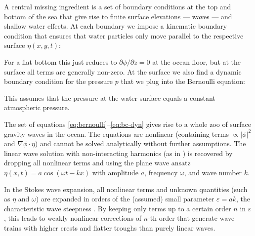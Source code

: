 A central missing ingredient is a set of boundary conditions at the top and bottom of the sea that give rise to finite surface elevations --- waves --- and shallow water effects. At each boundary we impose a kinematic boundary condition that ensures that water particles only move parallel to the respective surface $\eta(x, y, t)$:


For a flat bottom this just reduces to $\partial \phi / \partial z = 0$ at the ocean floor, but at the surface all terms are generally non-zero. At the surface we also find a dynamic boundary condition for the pressure $p$ that we plug into the Bernoulli equation:


This assumes that the pressure at the water surface equals a constant atmospheric pressure.

The set of equations \eqref{eq:bernoulli}--\eqref{eq:bc-dyn} gives rise to a whole zoo of surface gravity waves in the ocean. The equations are nonlinear (containing terms $\propto \lvert \phi \rvert^2$ and $\nabla \phi \cdot \eta$) and cannot be solved analytically without further assumptions. The linear wave solution with non-interacting harmonics (as in ) is recovered by dropping all nonlinear terms and using the plane wave ansatz $\eta(x, t) = a \cos(\omega t - k x)$ with amplitude $a$, frequency $\omega$, and wave number $k$.

In the Stokes wave expansion, all nonlinear terms and unknown quantities (such as $\eta$ and $\omega$) are expanded in orders of the (assumed) small parameter $\varepsilon=ak$, the characteristic wave steepness \citep[see \eg][]{dean_water_1991}. By keeping only terms up to a certain order $n$ in $\varepsilon$, this leads to weakly nonlinear corrections of $n$-th order that generate wave trains with higher crests and flatter troughs than purely linear waves.

